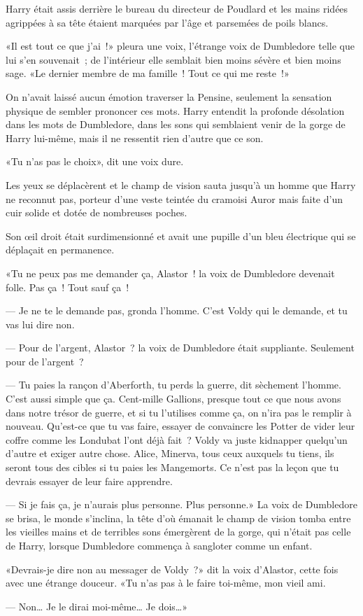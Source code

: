 \begin{em}
Harry était assis derrière le bureau du directeur de Poudlard et les mains ridées agrippées à sa tête étaient marquées par l'âge et parsemées de poils blancs.

«Il est tout ce que j'ai~!» pleura une voix, l'étrange voix de Dumbledore telle que lui s'en souvenait~; de l'intérieur elle semblait bien moins sévère et bien moins sage. «Le dernier membre de ma famille~! Tout ce qui me reste~!»

On n'avait laissé aucun émotion traverser la Pensine, seulement la sensation physique de sembler prononcer ces mots. Harry entendit la profonde désolation dans les mots de Dumbledore, dans les sons qui semblaient venir de la gorge de Harry lui-même, mais il ne ressentit rien d'autre que ce son.

«Tu n'as pas le choix», dit une voix dure.

Les yeux se déplacèrent et le champ de vision sauta jusqu'à un homme que Harry ne reconnut pas, porteur d'une veste teintée du cramoisi Auror mais faite d'un cuir solide et dotée de nombreuses poches.

Son œil droit était surdimensionné et avait une pupille d'un bleu électrique qui se déplaçait en permanence.

«Tu ne peux pas me demander ça, Alastor~! la voix de Dumbledore devenait folle. Pas ça~! Tout sauf ça~!

--- Je ne te le demande pas, gronda l'homme. C'est Voldy qui le demande, et tu vas lui dire non.

--- Pour de l'argent, Alastor~? la voix de Dumbledore était suppliante. Seulement pour de l'argent~?

--- Tu paies la rançon d'Aberforth, tu perds la guerre, dit sèchement l'homme. C'est aussi simple que ça. Cent-mille Gallions, presque tout ce que nous avons dans notre trésor de guerre, et si tu l'utilises comme ça, on n'ira pas le remplir à nouveau. Qu'est-ce que tu vas faire, essayer de convaincre les Potter de vider leur coffre comme les Londubat l'ont déjà fait~? Voldy va juste kidnapper quelqu'un d'autre et exiger autre chose. Alice, Minerva, tous ceux auxquels tu tiens, ils seront tous des cibles si tu paies les Mangemorts. Ce n'est pas la leçon que tu devrais essayer de leur faire apprendre.

--- Si je fais ça, je n'aurais plus personne. Plus personne.» La voix de Dumbledore se brisa, le monde s'inclina, la tête d'où émanait le champ de vision tomba entre les vieilles mains et de terribles sons émergèrent de la gorge, qui n'était pas celle de Harry, lorsque Dumbledore commença à sangloter comme un enfant.

«Devrais-je dire non au messager de Voldy~?» dit la voix d'Alastor, cette fois avec une étrange douceur. «Tu n'as pas à le faire toi-même, mon vieil ami.

--- Non… Je le dirai moi-même… Je dois…»
\end{em}

